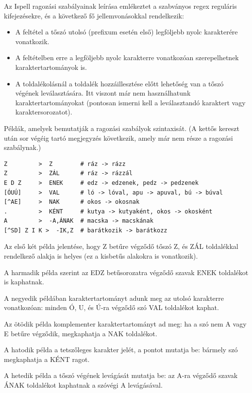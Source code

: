 Az Ispell ragozási szabályainak leírása emlékeztet
a szabványos regex reguláris kifejezésekre, és
a következő fő jellemvonásokkal rendelkezik:

\begin{itemize}
\item A feltétel a tőszó utolsó (prefixum esetén első) legföljebb nyolc
karakterére vonatkozik.

\item A feltételben erre a legföljebb nyolc karakterre
vonatkozóan szerepelhetnek karaktertartományok is.

\item A toldalékolásnál a toldalék hozzáillesztése előtt
lehetőség van a tőszó végének leválasztására.
Itt viszont már nem használhatunk karaktertartományokat
(pontosan ismerni kell a leválasztandó karaktert vagy
karaktersorozatot).
\end{itemize}

Példák, amelyek bemutatják a ragozási szabályok szintaxisát.
(A kettős kereszt után sor végéig tartó megjegyzés
következik, amely már nem része a ragozási szabálynak.)

\begin{verbatim}
Z         >  Z        # ráz -> rázz
Z         >  ZÁL      # ráz -> rázzál
E D Z     >  ENEK     # edz -> edzenek, pedz -> pedzenek
[ÓUÚ]     >  VAL      # ló -> lóval, apu -> apuval, bú -> búval
[^AE]     >  NAK      # okos -> okosnak
.         >  KÉNT     # kutya -> kutyaként, okos -> okosként
A         >  -A,ÁNAK  # macska -> macskának
[^SD] Z I K >  -IK,Z  # barátkozik -> barátkozz
\end{verbatim}

Az első két példa jelentése, hogy Z betűre végződő tőszó
Z, és ZÁL toldalékkal rendelkező alakja is helyes (ez 
a kisbetűs alakokra is vonatkozik).

A harmadik példa szerint az EDZ betűsorozatra végződő
szavak ENEK toldalékot is kaphatnak.

A negyedik példában karaktertartományt adunk meg az utolsó
karakterre vonatkozóan: minden Ó, U, és Ú-ra végződő szó
VAL toldalékot kaphat.

Az ötödik példa komplementer karaktertartományt ad meg:
ha a szó nem A vagy E betűre végződik, megkaphatja a
NAK toldalékot.

A hatodik példa a tetszőleges karakter jelét, a pontot
mutatja be: bármely szó megkaphatja a KÉNT ragot.

A hetedik példa a tőszó végének levágását mutatja be:
az A-ra végződő szavak ÁNAK toldalékot kaphatnak a
szóvégi A levágásával.

